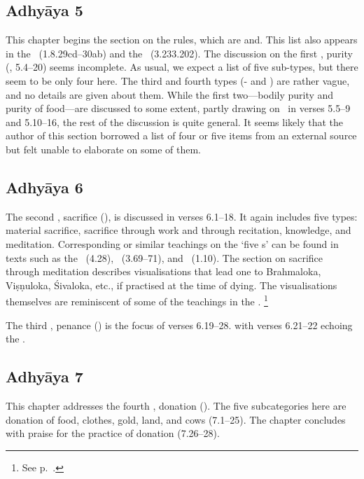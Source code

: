 \subsection*{Adhyāya 5}\label{contents_of_ch05}

This chapter begins the section on the  rules, which are
 and\linebreak {}. This list also appears in the
\LinPu\ (1.8.29cd--30ab) and the \VDhU\ (3.233.202).
The discussion on the first , purity (, 5.4--20) seems
incomplete. As usual, we expect a list of five sub-types, 
but there seem to be only four here. The third and fourth types
(- and ) are rather vague, and 
no details are given about them. 
While the first two---bodily purity and purity of food---are 
discussed to some extent, partly drawing on \Manu\ in verses 5.5--9 and 5.10--16, 
the rest of the discussion is quite general. It seems likely that
the author of this section borrowed a list of four or five items from 
an external source but felt unable to elaborate on some of them.




\subsection*{Adhyāya 6}\label{contents_of_ch06}
The second , sacrifice (), is discussed in verses
6.1--18. It again includes five types: material sacrifice, sacrifice through
work and through recitation, knowledge, and meditation. Corresponding
or similar teachings on the `five s' can be found in texts
such as the \BhG\ (4.28), \Manu\ (3.69--71), and \SDhU\ (1.10).
The section on sacrifice through meditation  
describes visualisations that lead one to 
Brahmaloka, Viṣṇuloka, Śivaloka, etc., if practised at the 
time of dying. The visualisations themselves are
reminiscent of some of the teachings in the \DharmP.%
        \footnote{See p.~\pageref{dhyanayajna}.}

The third , penance () is the focus of verses 6.19--28.
with verses 6.21--22 echoing the \MBh.


\subsection*{Adhyāya 7}\label{contents_of_ch07}
This chapter addresses the fourth , donation ().
The five subcategories here are donation of food, clothes, gold, land, and cows
(7.1--25). The chapter concludes with praise for the practice of donation (7.26--28).

